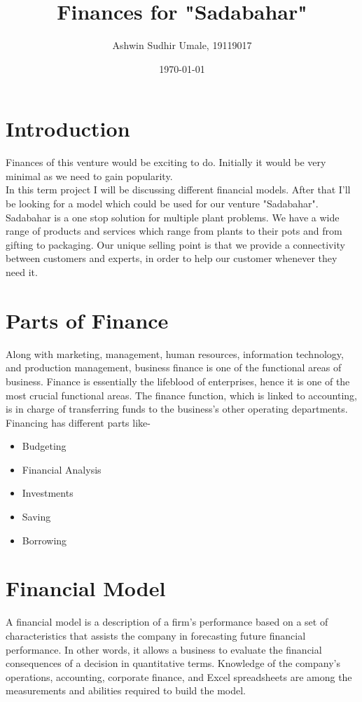 \documentclass{article}
\title{Finances for "Sadabahar"}
\author{Ashwin Sudhir Umale, 19119017}
\date{\today}
\begin{document}
\maketitle


\section{Introduction}

Finances of this venture would be exciting to do. Initially it would be very minimal as we need to gain popularity.
\\
In this term project I will be discussing different financial models. After that I'll be looking for a model which could be used for our venture "Sadabahar".
\\
Sadabahar is a one stop solution for multiple plant problems. We have a wide range of products and services which range from plants to their pots and from gifting to packaging. Our unique selling point is that we provide a connectivity between customers and experts, in order to help our customer whenever they need it.
\section{Parts of Finance}
Along with marketing, management, human resources, information technology, and production management, business finance is one of the functional areas of business. Finance is essentially the lifeblood of enterprises, hence it is one of the most crucial functional areas. The finance function, which is linked to accounting, is in charge of transferring funds to the business's other operating departments.
Financing has different parts like-
\begin{itemize}
    \item Budgeting
    \item Financial Analysis
    \item Investments
    \item Saving 
    \item Borrowing
\end{itemize}

\section{Financial Model}
A financial model is a description of a firm's performance based on a set of characteristics that assists the company in forecasting future financial performance. In other words, it allows a business to evaluate the financial consequences of a decision in quantitative terms. Knowledge of the company's operations, accounting, corporate finance, and Excel spreadsheets are among the measurements and abilities required to build the model.
\end{document}
